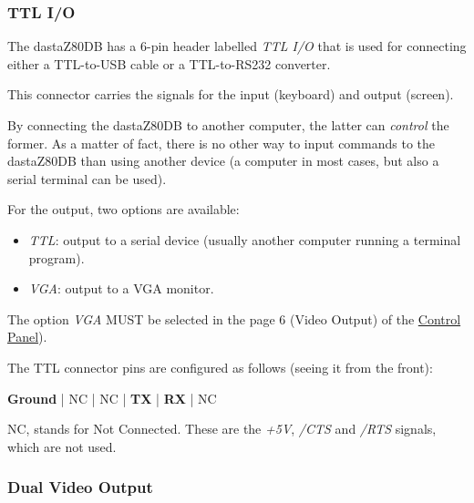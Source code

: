         \subsubsection{TTL I/O}
        \label{subsubsection:ttlio}

        The dastaZ80DB has a 6-pin header labelled \textit{TTL I/O} that is
        used for connecting either a TTL-to-USB cable or a TTL-to-RS232
        converter.

        This connector carries the signals for the input (keyboard) and output
        (screen).

        By connecting the dastaZ80DB to another computer, the latter can
        \textit{control} the former. As a matter of fact, there is no other way
        to input commands to the dastaZ80DB than using another device (a
        computer in most cases, but also a serial terminal can be used).

        For the output, two options are available:

        \begin{itemize}
            \item \textit{TTL}: output to a serial device (usually another
                computer running a terminal program).
            \item \textit{VGA}: output to a VGA monitor.
        \end{itemize}

        The option \textit{VGA} MUST be selected in the page 6 (Video Output) of
        the \hyperref[subsubsec:controlpanel]{Control Panel}).

        The TTL connector pins are configured as follows (seeing it from the
        front):

        \textbf{Ground} | NC | NC | \textbf{TX} | \textbf{RX} | NC

        NC, stands for Not Connected. These are the \textit{+5V}, \textit{/CTS}
        and \textit{/RTS} signals, which are not used.



        \subsubsection{Dual Video Output}

